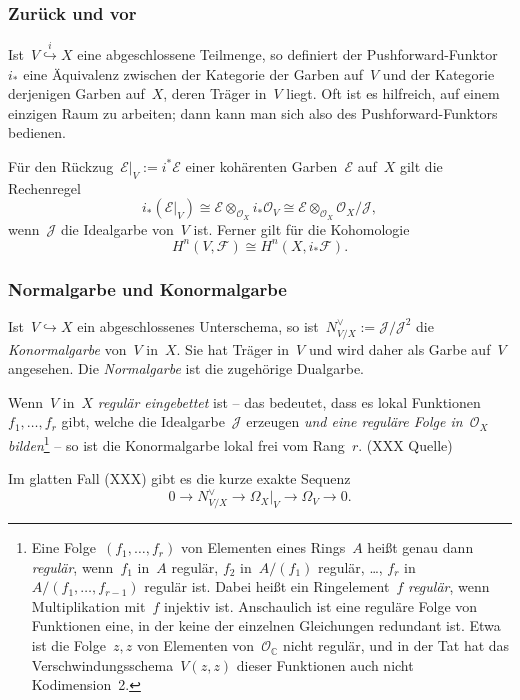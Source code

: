 \documentclass[a4paper,ngerman,12pt]{scrartcl}
\theoremstyle{definition}
\theoremstyle{plain}
\theoremstyle{remark}
\newcommand{\CC}{\mathbb{C}}
\newcommand{\E}{\mathcal{E}}
\newcommand{\F}{\mathcal{F}}
\newcommand{\J}{\mathcal{J}}
\renewcommand{\O}{\mathcal{O}}
\newcommand{\lra}{\longrightarrow}
\begin{document}
\subsubsection*{Zurück und vor}

Ist~$V \stackrel{i}{\hookrightarrow} X$ eine abgeschlossene Teilmenge, so
definiert der Pushforward-Funktor~$i_*$ eine Äquivalenz zwischen der Kategorie
der Garben auf~$V$ und der Kategorie derjenigen Garben auf~$X$, deren Träger
in~$V$ liegt. Oft ist es hilfreich, auf einem einzigen Raum zu arbeiten; dann
kann man sich also des Pushforward-Funktors bedienen.

Für den Rückzug~$\E|_V := i^* \E$ einer kohärenten Garben~$\E$ auf~$X$ gilt die
Rechenregel
\[ i_* (\E|_V) \cong \E \otimes_{\O_X} i_*\O_V \cong \E \otimes_{\O_X} \O_X/\J,
\]
wenn~$\J$ die Idealgarbe von~$V$ ist. Ferner gilt für die Kohomologie
\[ H^n(V, \F) \cong H^n(X, i_*\F). \]


\subsubsection*{Normalgarbe und Konormalgarbe}

Ist~$V \hookrightarrow X$ ein abgeschlossenes Unterschema, so ist~$N_{V/X}^\vee
:= \J/\J^2$ die \emph{Konormalgarbe} von~$V$ in~$X$. Sie hat Träger in~$V$ und
wird daher als Garbe auf~$V$ angesehen. Die \emph{Normalgarbe} ist die
zugehörige Dualgarbe.

Wenn~$V$ in~$X$ \emph{regulär eingebettet} ist -- das bedeutet, dass es lokal
Funktionen~$f_1,\ldots,f_r$ gibt, welche die Idealgarbe~$\J$ erzeugen \emph{und
eine reguläre Folge in~$\O_X$ bilden}\footnote{Eine Folge~$(f_1,\ldots,f_r)$
von Elementen eines Rings~$A$ heißt genau dann \emph{regulär}, wenn~$f_1$
in~$A$ regulär, $f_2$ in~$A/(f_1)$ regulär, \ldots, $f_r$
in~$A/(f_1,\ldots,f_{r-1})$ regulär ist. Dabei heißt ein Ringelement~$f$
\emph{regulär}, wenn Multiplikation mit~$f$ injektiv ist. Anschaulich ist eine
reguläre Folge von Funktionen eine, in der keine der einzelnen Gleichungen
redundant ist. Etwa ist die Folge~$z, z$ von Elementen von~$\O_\CC$ nicht
regulär, und in der Tat hat das Verschwindungsschema~$V(z,z)$ dieser Funktionen
auch nicht Kodimension~2.} -- so ist die Konormalgarbe lokal frei
vom Rang~$r$. (XXX Quelle)

Im glatten Fall (XXX) gibt es die kurze exakte Sequenz
\[ 0 \lra N_{V/X}^\vee \lra \Omega_X|_V \lra \Omega_V \lra 0. \]
\end{document}
